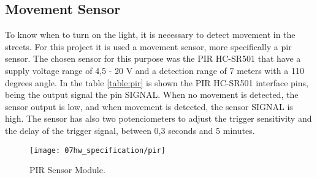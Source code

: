 \subsection{Movement Sensor}

To know when to turn on the light, it is necessary to detect movement in the streets. For this project it is used a movement sensor, more specifically a \ac{pir} sensor. The chosen sensor for this purpose was the PIR HC-SR501 that have a supply voltage range of 4,5 - 20 V and a detection range of 7 meters with a 110 degrees angle. In the table \ref{table:pir} is shown the PIR HC-SR501 interface pins, being the output signal the pin SIGNAL. When no movement is detected, the sensor output is low, and when movement is detected, the sensor SIGNAL is high. The sensor has also two potenciometers to adjust the trigger sensitivity and the delay of the trigger signal, between 0,3 seconds and 5 minutes.

\begin{figure}[H]
	\centering
	\texttt{[image: 07hw\_specification/pir]}
	\caption{PIR Sensor Module.}
	\label{fig:pir}
\end{figure}

\begin{table}[H]
	\centering
	
	\caption{PIR Module Interface Pins.}
	\label{table:pir}
\end{table}